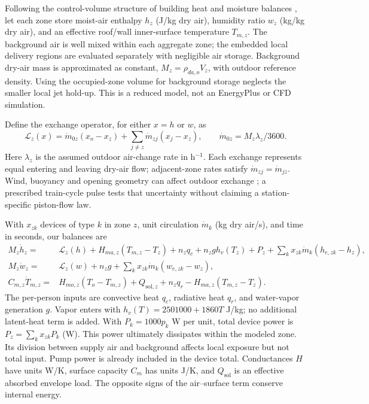 Following the control-volume structure of building heat and moisture balances \cite{epzone}, let each zone store moist-air enthalpy $h_z$ (J/kg dry air), humidity ratio $w_z$ (kg/kg dry air), and an effective roof/wall inner-surface temperature $T_{m,z}$. The background air is well mixed within each aggregate zone; the embedded local delivery regions are evaluated separately with negligible air storage. Background dry-air mass is approximated as constant, $M_z=\rho_{da,o}V_z$, with outdoor reference density. Using the occupied-zone volume for background storage neglects the smaller local jet hold-up. This is a reduced model, not an EnergyPlus or CFD simulation.

Define the exchange operator, for either $x=h$ or $w$, as
\begin{equation}
 \mathcal L_z(x)=\dot m_{0z}(x_o-x_z)+\sum_{j\ne z}\dot m_{zj}(x_j-x_z),
 \qquad \dot m_{0z}=M_z\lambda_z/3600.
\label{eq:rail-exchange}
\end{equation}
Here $\lambda_z$ is the assumed outdoor air-change rate in h$^{-1}$. Each exchange represents equal entering and leaving dry-air flow; adjacent-zone rates satisfy $\dot m_{zj}=\dot m_{jz}$. Wind, buoyancy and opening geometry can affect outdoor exchange \cite{ventilation}; a prescribed train-cycle pulse tests that uncertainty without claiming a station-specific piston-flow law.

With $x_{zk}$ devices of type $k$ in zone $z$, unit circulation $\dot m_k$ (kg dry air/s), and time in seconds, our balances are
\begin{align}
 M_z\dot h_z={}&\mathcal L_z(h)+H_{ma,z}(T_{m,z}-T_z)
 +n_zq_c+n_zg h_v(T_z)+P_z
 +\sum_k x_{zk}\dot m_k(h_{e,zk}-h_z),\label{eq:rail-enthalpy}\\
 M_z\dot w_z={}&\mathcal L_z(w)+n_zg+
 \sum_k x_{zk}\dot m_k(w_{e,zk}-w_z),\label{eq:rail-moisture}\\
 C_{m,z}\dot T_{m,z}={}&H_{mo,z}(T_o-T_{m,z})+Q_{\mathrm{sol},z}
 +n_zq_r-H_{ma,z}(T_{m,z}-T_z).\label{eq:rail-surface}
\end{align}
The per-person inputs are convective heat $q_c$, radiative heat $q_r$, and water-vapor generation $g$. Vapor enters with $h_v(T)=2501000+1860T$ J/kg; no additional latent-heat term is added. With $P_k=1000p_k$ W per unit, total device power is $P_z=\sum_k x_{zk}P_k$ (W). This power ultimately dissipates within the modeled zone. Its division between supply air and background affects local exposure but not total input. Pump power is already included in the device total. Conductances $H$ have units W/K, surface capacity $C_m$ has units J/K, and $Q_{\mathrm{sol}}$ is an effective absorbed envelope load. The opposite signs of the air--surface term conserve internal energy.

